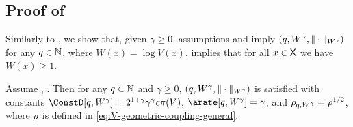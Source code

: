\subsection{Proof of }
\label{sec:proof-ros_log_V}
Similarly to , we show that, given $\gamma \geq 0$, assumptions  and  imply $(q,W^{\gamma},\Vnorm[W^\gamma]{\cdot})$ for any $q \in \nset$, where $W(x) = \log{V(x)}$.  implies that for all $x \in \Xset$ we have $W(x) \geq 1$.

\begin{lemma}
\label{coro:centered_moments_W_class_new}
Assume , . Then for any $q \in \nset$ and $\gamma \geq 0$, $(q,W^{\gamma},\Vnorm[W^\gamma]{\cdot})$ is satisfied with constants $\ConstD[q,W^{\gamma}] = 2^{1+\gamma}\gamma^{\gamma}\cmconstv\pi(V)$, $\arate[q,W^{\gamma}] = \gamma$, and $\rho_{q,W^{\gamma}} = \ratev^{1/2}$, where $\ratev$ is defined in \eqref{eq:V-geometric-coupling-general}.
\end{lemma}
